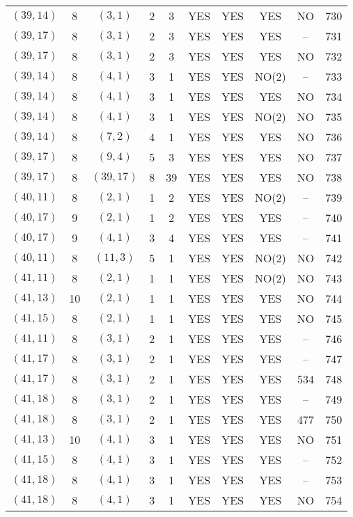 \begin{longtable}{|c|c|c|c|c|c|c|c|c|c|}
$(39, 14)$ & 8 & $(3, 1)$ & 2 & 3 & YES & YES & YES & NO & 730\\
$(39, 17)$ & 8 & $(3, 1)$ & 2 & 3 & YES & YES & YES & -- & 731\\
$(39, 17)$ & 8 & $(3, 1)$ & 2 & 3 & YES & YES & YES & NO & 732\\
$(39, 14)$ & 8 & $(4, 1)$ & 3 & 1 & YES & YES & NO(2) & -- & 733\\
$(39, 14)$ & 8 & $(4, 1)$ & 3 & 1 & YES & YES & YES & NO & 734\\
$(39, 14)$ & 8 & $(4, 1)$ & 3 & 1 & YES & YES & NO(2) & NO & 735\\
$(39, 14)$ & 8 & $(7, 2)$ & 4 & 1 & YES & YES & YES & NO & 736\\
$(39, 17)$ & 8 & $(9, 4)$ & 5 & 3 & YES & YES & YES & NO & 737\\
$(39, 17)$ & 8 & $(39, 17)$ & 8 & 39 & YES & YES & YES & NO & 738\\
$(40, 11)$ & 8 & $(2, 1)$ & 1 & 2 & YES & YES & NO(2) & -- & 739\\
$(40, 17)$ & 9 & $(2, 1)$ & 1 & 2 & YES & YES & YES & -- & 740\\
$(40, 17)$ & 9 & $(4, 1)$ & 3 & 4 & YES & YES & YES & -- & 741\\
$(40, 11)$ & 8 & $(11, 3)$ & 5 & 1 & YES & YES & NO(2) & NO & 742\\
$(41, 11)$ & 8 & $(2, 1)$ & 1 & 1 & YES & YES & NO(2) & NO & 743\\
$(41, 13)$ & 10 & $(2, 1)$ & 1 & 1 & YES & YES & YES & NO & 744\\
$(41, 15)$ & 8 & $(2, 1)$ & 1 & 1 & YES & YES & YES & NO & 745\\
$(41, 11)$ & 8 & $(3, 1)$ & 2 & 1 & YES & YES & YES & -- & 746\\
$(41, 17)$ & 8 & $(3, 1)$ & 2 & 1 & YES & YES & YES & -- & 747\\
$(41, 17)$ & 8 & $(3, 1)$ & 2 & 1 & YES & YES & YES & 534 & 748\\
$(41, 18)$ & 8 & $(3, 1)$ & 2 & 1 & YES & YES & YES & -- & 749\\
$(41, 18)$ & 8 & $(3, 1)$ & 2 & 1 & YES & YES & YES & 477 & 750\\
$(41, 13)$ & 10 & $(4, 1)$ & 3 & 1 & YES & YES & YES & NO & 751\\
$(41, 15)$ & 8 & $(4, 1)$ & 3 & 1 & YES & YES & YES & -- & 752\\
$(41, 18)$ & 8 & $(4, 1)$ & 3 & 1 & YES & YES & YES & -- & 753\\
$(41, 18)$ & 8 & $(4, 1)$ & 3 & 1 & YES & YES & YES & NO & 754\\

\end{longtable}
